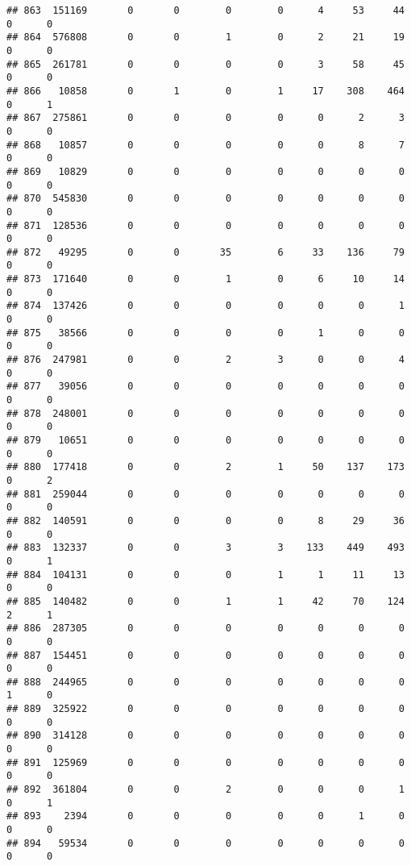 \documentclass[
]{article}
\begin{document}
\begin{verbatim}
## 863  151169       0       0        0        0      4     53     44     0      0
## 864  576808       0       0        1        0      2     21     19     0      0
## 865  261781       0       0        0        0      3     58     45     0      0
## 866   10858       0       1        0        1     17    308    464     0      1
## 867  275861       0       0        0        0      0      2      3     0      0
## 868   10857       0       0        0        0      0      8      7     0      0
## 869   10829       0       0        0        0      0      0      0     0      0
## 870  545830       0       0        0        0      0      0      0     0      0
## 871  128536       0       0        0        0      0      0      0     0      0
## 872   49295       0       0       35        6     33    136     79     0      0
## 873  171640       0       0        1        0      6     10     14     0      0
## 874  137426       0       0        0        0      0      0      1     0      0
## 875   38566       0       0        0        0      1      0      0     0      0
## 876  247981       0       0        2        3      0      0      4     0      0
## 877   39056       0       0        0        0      0      0      0     0      0
## 878  248001       0       0        0        0      0      0      0     0      0
## 879   10651       0       0        0        0      0      0      0     0      0
## 880  177418       0       0        2        1     50    137    173     0      2
## 881  259044       0       0        0        0      0      0      0     0      0
## 882  140591       0       0        0        0      8     29     36     0      0
## 883  132337       0       0        3        3    133    449    493     0      1
## 884  104131       0       0        0        1      1     11     13     0      0
## 885  140482       0       0        1        1     42     70    124     2      1
## 886  287305       0       0        0        0      0      0      0     0      0
## 887  154451       0       0        0        0      0      0      0     0      0
## 888  244965       0       0        0        0      0      0      0     1      0
## 889  325922       0       0        0        0      0      0      0     0      0
## 890  314128       0       0        0        0      0      0      0     0      0
## 891  125969       0       0        0        0      0      0      0     0      0
## 892  361804       0       0        2        0      0      0      1     0      1
## 893    2394       0       0        0        0      0      1      0     0      0
## 894   59534       0       0        0        0      0      0      0     0      0

\end{verbatim}
\end{document}

